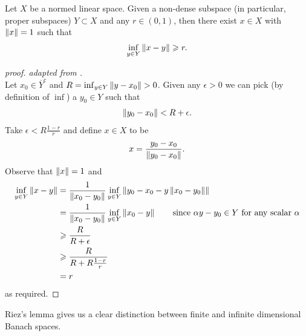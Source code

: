 \documentclass[12pt]{article}
\begin{document}
\begin{flemma}
    Let $X$ be a normed linear space. Given a non-dense subspace (in particular, proper subspaces) $Y \subset X$ and any $r \in (0, 1)$, then there exist $x \in X$ with $\norm[x] = 1$ such that 
    \begin{align*}
    \inf_{y \in Y} \norm[x - y] \geq r. 
    \end{align*}
\end{flemma}
\begin{proof}[proof. adapted from \cite{Paul2017-mo}] \hfill \\
    Let $x_0 \in \overline{Y}^c$ and $R = \inf_{y \in Y}\norm[y - x_0] > 0$. Given any $\epsilon > 0$ we can pick (by definition of $\inf$) a $y_0 \in Y$ such that 
    \begin{align*}
    \norm[y_0 - x_0] < R + \epsilon. 
    \end{align*}
    Take $\epsilon < R \frac{1 - r}{r}$ and define $x \in X$ to be
    \begin{align*}
    x = \frac{y_0 - x_0}{\norm[y_0 - x_0]}. 
    \end{align*}
    Observe that $\norm[x] = 1$ and 
    \begin{align*}
    \inf_{y \in Y} \norm[x - y] 
    &= \frac{1}{\norm[x_0 - y_0]} \inf_{y \in Y} \norm[y_0 - x_0 - y \norm[x_0 - y_0] ] \\
    &= \frac{1}{\norm[x_0 - y_0]} \inf_{y \in Y} \norm[x_0 - y] \tag*{since $\alpha y - y_0 \in Y$ for any scalar $\alpha$} \\
    &\geq \frac{R}{R + \epsilon} \\
    &\geq \frac{R}{R + R \frac{1 - r}{r}} \\
    &= r
    \end{align*}
    as required. 
\end{proof}


Riez's lemma gives us a clear distinction between finite and infinite dimensional Banach spaces. 
\end{document}
